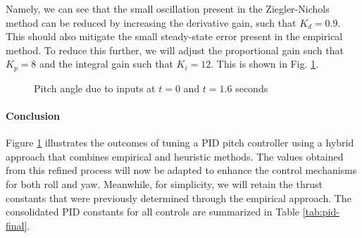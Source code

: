 \documentclass[12pt]{article}
\begin{document}
Namely, we can see that the small oscillation present in the Ziegler-Nichols method can be reduced by increasing the derivative gain, such that $K_d = 0.9$. This should also mitigate the small steady-state error present in the empirical method. To reduce this further, we will adjust the proportional gain such that $K_p = 8$ and the integral gain such that $K_i = 12$. This is shown in Fig. \ref{fig:combined-znemp}.

\begin{figure}[ht]
    \centering
    \caption{Pitch angle due to inputs at $t = 0$ and $t = 1.6$ seconds}
    \label{fig:combined-znemp}
\end{figure}


\paragraph{Conclusion}
Figure \ref{fig:combined-znemp} illustrates the outcomes of tuning a PID pitch controller using a hybrid approach that combines empirical and heuristic methods. The values obtained from this refined process will now be adapted to enhance the control mechanisms for both roll and yaw. Meanwhile, for simplicity, we will retain the thrust constants that were previously determined through the empirical approach. The consolidated PID constants for all controls are summarized in Table \ref{tab:pid-final}.
\end{document}
